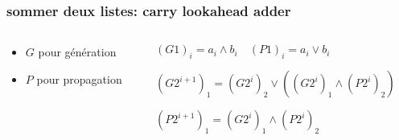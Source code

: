 \documentclass[10pt,xcolor={usenames,dvipsnames}]{beamer}
\begin{document}
\begin{frame} 
\frametitle{sommer deux listes: carry lookahead adder}
  \begin{figure}
    \begin{center}
      \begin{tikzpicture}[scale = 0.5, transform shape]
      	
      \end{tikzpicture}
    \end{center}
  \end{figure}


\begin{columns}
\begin{column}{0.4\textwidth}
\pause
\begin{itemize}
\item $G$ pour génération
  \begin{figure}
    \begin{center}
      \begin{tikzpicture}[scale = 0.6, transform shape]
      	
      \end{tikzpicture}
    \end{center}
  \end{figure}
\item $P$ pour propagation
  \begin{figure}
    \begin{center}
      \begin{tikzpicture}[scale = 0.6, transform shape]
      	
      \end{tikzpicture}
    \end{center}
  \end{figure}
\end{itemize}
\end{column}

\begin{column}{0.6\textwidth}  %
\pause


$(G1)_i = a_i \wedge b_i \quad (P1)_i = a_i \vee b_i$
\pause

  \begin{figure}
    \begin{center}
      \begin{tikzpicture}[scale = 0.9, transform shape]
      	
      \end{tikzpicture}
    \end{center}
  \end{figure}

${(G2^{i+1})}_1 = {(G2^i)}_2 \vee \left ( {(G2^i)}_1 \wedge {(P2^i)}_2 \right)$\\

\vspace{0.3cm}

${(P2^{i+1})}_1 = {(G2^i)}_1 \wedge {(P2^i)}_2$

\end{column}
\end{columns}

\end{frame} 
\end{document}
